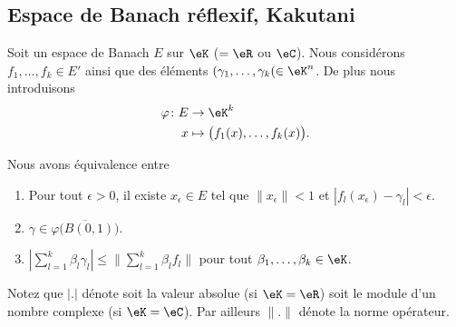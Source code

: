 \subsection{Espace de Banach réflexif, Kakutani}

\begin{lemma}	\label{LEMooSBWJooKIfuJj}
	Soit un espace de Banach \( E\) sur \( \eK\) (\( =\eR\) ou \( \eC\)). Nous considérons \( f_1,\ldots,f_k\in E'\) ainsi que des éléments \( (\gamma_1,\ldots,\gamma_k(\in \eK^n\). De plus nous introduisons
	\begin{equation}
		\begin{aligned}
			\varphi\colon E & \to \eK^k                                 \\
			x               & \mapsto \big( f_1(x),\ldots,f_k(x) \big).
		\end{aligned}
	\end{equation}

	Nous avons équivalence entre
	\begin{enumerate}
		\item		\label{ITEMooDMOOooPJtgTE}
		      Pour tout \( \epsilon>0\), il existe \( x_{\epsilon}\in E\) tel que \( \| x_{\epsilon} \|<1\) et \( | f_l(x_{\epsilon})-\gamma_{l} |<\epsilon\).
		\item		\label{ITEMooAQAJooHmSXGW}
		      \( \gamma\in\overline{\varphi\big( B(0,1) \big)}\).
		\item		\label{ITEMooXJKAooFHUsOv}
		      \( | \sum_{l=1}^k\beta_l\gamma_l |\leq \| \sum_{l=1}^k\beta_lf_l \|\) pour tout \( \beta_1,\ldots,\beta_k\in \eK\).
	\end{enumerate}
	Notez que \( | . |\) dénote soit la valeur absolue (si \( \eK=\eR\)) soit le module d'un nombre complexe (si \( \eK=\eC\)). Par ailleurs \( \| . \|\) dénote la norme opérateur.
\end{lemma}

